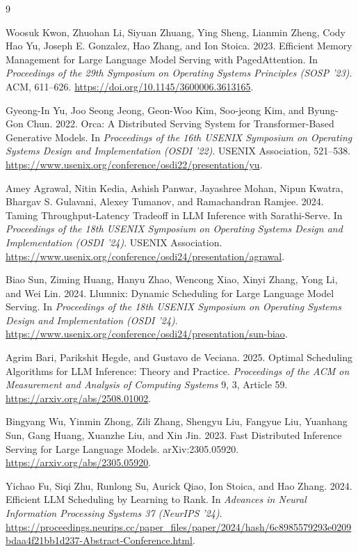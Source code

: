 \documentclass[sigplan,nonacm]{acmart}
\begin{document}
\begin{thebibliography}{9}

Woosuk Kwon, Zhuohan Li, Siyuan Zhuang,
Ying Sheng, Lianmin Zheng, Cody Hao Yu,
Joseph E. Gonzalez, Hao Zhang, and Ion Stoica.
2023.
Efficient Memory Management for Large Language
Model Serving with PagedAttention.
In \emph{Proceedings of the 29th Symposium
on Operating Systems Principles (SOSP '23)}.
ACM, 611--626.
\url{https://doi.org/10.1145/3600006.3613165}.

Gyeong-In Yu, Joo Seong Jeong, Geon-Woo Kim,
Soo-jeong Kim, and Byung-Gon Chun.
2022.
Orca: A Distributed Serving System for
Transformer-Based Generative Models.
In \emph{Proceedings of the 16th USENIX
Symposium on Operating Systems Design
and Implementation (OSDI '22)}.
USENIX Association, 521--538.
\url{https://www.usenix.org/conference/osdi22/presentation/yu}.

Amey Agrawal, Nitin Kedia, Ashish Panwar,
Jayashree Mohan, Nipun Kwatra,
Bhargav S. Gulavani, Alexey Tumanov,
and Ramachandran Ramjee.
2024.
Taming Throughput-Latency Tradeoff
in LLM Inference with Sarathi-Serve.
In \emph{Proceedings of the 18th USENIX
Symposium on Operating Systems Design
and Implementation (OSDI '24)}.
USENIX Association.
\url{https://www.usenix.org/conference/osdi24/presentation/agrawal}.

Biao Sun, Ziming Huang, Hanyu Zhao, Wencong Xiao,
Xinyi Zhang, Yong Li, and Wei Lin. 2024.
Llumnix: Dynamic Scheduling for Large Language Model Serving.
In \emph{Proceedings of the 18th USENIX Symposium on Operating Systems
Design and Implementation (OSDI '24)}.
\url{https://www.usenix.org/conference/osdi24/presentation/sun-biao}.

Agrim Bari, Parikshit Hegde, and Gustavo de Veciana. 2025.
Optimal Scheduling Algorithms for LLM Inference: Theory and Practice.
\emph{Proceedings of the ACM on Measurement and Analysis of Computing Systems}
9, 3, Article 59.
\url{https://arxiv.org/abs/2508.01002}.

Bingyang Wu, Yinmin Zhong, Zili Zhang, Shengyu Liu, Fangyue Liu,
Yuanhang Sun, Gang Huang, Xuanzhe Liu, and Xin Jin. 2023.
Fast Distributed Inference Serving for Large Language Models.
arXiv:2305.05920.
\url{https://arxiv.org/abs/2305.05920}.

Yichao Fu, Siqi Zhu, Runlong Su, Aurick Qiao, Ion Stoica,
and Hao Zhang. 2024.
Efficient LLM Scheduling by Learning to Rank.
In \emph{Advances in Neural Information Processing Systems 37 (NeurIPS '24)}.
\url{https://proceedings.neurips.cc/paper_files/paper/2024/hash/6c8985579293e0209bdaa4f21bb1d237-Abstract-Conference.html}.


\end{thebibliography}
\end{document}
